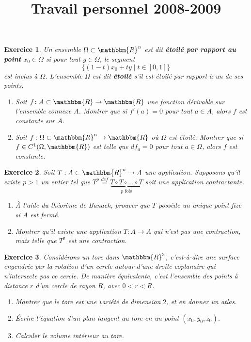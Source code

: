\documentclass[a4paper,12pt]{article}
\theoremstyle{PourExo}\newtheorem{exercice}{Exercice}
\newcommand{\defe}[2]{ {\bf #1} }
\newcommand{\eR}{\mathbbm{R}}
\begin{document}
\title{Travail personnel 2008-2009}
\maketitle

\begin{exercice}

Un ensemble $\Omega\subset\eR^n$ est dit \defe{étoilé par rapport au point}{ensemble étoilé} $x_0\in\Omega$ si pour tout $y \in \Omega$, le segment
\begin{equation*}
	\{ (1-t) x_0 + t y \mid t \in  [0,1] \}
\end{equation*}
est inclus à $\Omega$. L'ensemble $\Omega$ est dit \defe{étoilé}{ensemble étoilé} s'il est étoilé par rapport à un de ses points.

\begin{enumerate}
\item
Soit $f\colon A\subset \eR\to\eR$ une fonction dérivable sur l'ensemble connexe $A$. Montrer que si $f'(a)=0$ pour tout $a\in A$, alors $f$ est constante sur $A$.

\item
Soit $f : \Omega \subset \eR^n \to \eR$ où $\Omega$ est étoilé. Montrer que si $f \in C^1(\Omega,{\eR})$ est telle que $df_a = 0$ pour tout $a \in \Omega$, alors $f$ est constante.

\end{enumerate}
\end{exercice}

\begin{exercice}
Soit $T : A \subset {\eR}^n \to A$ une application. Supposons qu'il existe $p > 1$ un entier tel que $T^p \stackrel{def}{=} \underbrace{T \circ T \circ \ldots \circ T}_{\text{$p$ fois}}$ soit une application contractante.

\begin{enumerate}
\item
À l'aide du théorème de Banach, prouver que $T$ possède un unique point fixe si $A$ est fermé.
\item
Montrer qu'il existe une application $T : A \to A$ qui n'est pas une contraction, mais telle que $T^2$ est une contraction.
\end{enumerate}
\end{exercice}

\begin{exercice}
Considérons un tore dans ${\eR}^3$, c'est-à-dire une surface engendrée par la rotation d'un cercle autour d'une droite coplanaire qui n'intersecte pas ce cercle. De manière équivalente, c'est l'ensemble des points à distance $r$ d'un cercle de rayon $R$, avec $0 < r < R$.
\begin{enumerate}
\item
Montrer que le tore est une variété de dimension $2$, et en donner un atlas.
\item
Écrire l'équation d'un plan tangent au tore en un point $(x_0, y_0, z_0)$.
\item
Calculer le volume intérieur au tore.
\end{enumerate}
\end{exercice}
\end{document}
